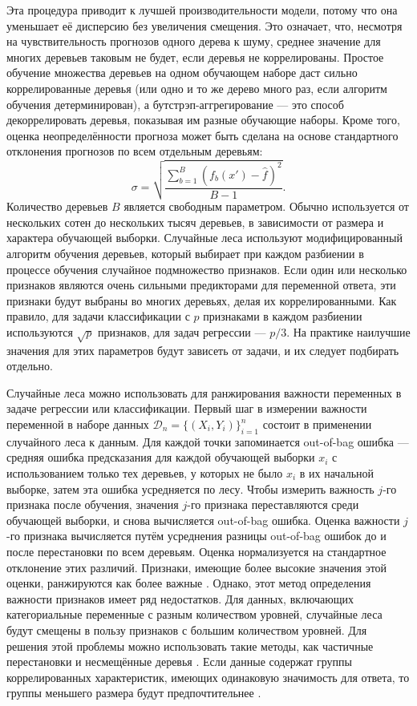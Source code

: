 Эта процедура приводит к лучшей производительности модели, потому что она уменьшает её дисперсию без увеличения смещения. Это означает, что, несмотря на чувствительность прогнозов одного дерева к шуму, среднее значение для многих деревьев таковым не будет, если деревья не коррелированы. Простое обучение множества деревьев на одном обучающем наборе даст сильно коррелированные деревья (или одно и то же дерево много раз, если алгоритм обучения детерминирован), а бутстрэп-аггрегирование --- это способ декоррелировать деревья, показывая им разные обучающие наборы. Кроме того, оценка неопределённости прогноза может быть сделана на основе стандартного отклонения прогнозов по всем отдельным деревьям:
\begin{equation}
\label{eq:rf_error}
\sigma = {\sqrt{\frac{\sum_{b = 1}^{B} (f_{b} (x') - {\hat{f}})^{2}} {B-1}}}.
\end{equation}
Количество деревьев $B$ является свободным параметром. Обычно используется от нескольких сотен до нескольких тысяч деревьев, в зависимости от размера и характера обучающей выборки. Случайные леса используют модифицированный алгоритм обучения деревьев, который выбирает при каждом разбиении в процессе обучения случайное подмножество признаков. Если один или несколько признаков являются очень сильными предикторами для переменной ответа, эти признаки будут выбраны во многих деревьях, делая их коррелированными. Как правило, для задачи классификации с $p$ признаками в каждом разбиении используются $\sqrt{p}$ признаков, для задач регрессии --- $p / 3$. На практике наилучшие значения для этих параметров будут зависеть от задачи, и их следует подбирать отдельно.

Случайные леса можно использовать для ранжирования важности переменных в задаче регрессии или классификации. Первый шаг в измерении важности переменной в наборе данных $\mathcal{D}_{n} = \{(X_{i}, Y_{i}) \}_{i = 1}^{n}$ состоит в применении случайного леса к данным. Для каждой точки запоминается out-of-bag ошибка --- средняя ошибка предсказания для каждой обучающей выборки $x_i$ с использованием только тех деревьев, у которых не было $x_i$ в их начальной выборке, затем эта ошибка усредняется по лесу. Чтобы измерить важность $j$-го признака после обучения, значения $j$-го признака переставляются среди обучающей выборки, и снова вычисляется out-of-bag ошибка. Оценка важности $j$-го признака вычисляется путём усреднения разницы out-of-bag ошибок до и после перестановки по всем деревьям. Оценка нормализуется на стандартное отклонение этих различий. Признаки, имеющие более высокие значения этой оценки, ранжируются как более важные \autocite{Zhu2015tree}. Однако, этот метод определения важности признаков имеет ряд недостатков. Для данных, включающих категориальные переменные с разным количеством уровней, случайные леса будут смещены в пользу признаков с большим количеством уровней. Для решения этой проблемы можно использовать такие методы, как частичные перестановки \autocite{Altmann2010} и несмещённые деревья \autocite{Strobl2007}. Если данные содержат группы коррелированных характеристик, имеющих одинаковую значимость для ответа, то группы меньшего размера будут предпочтительнее \autocite{Toloi2011}.

